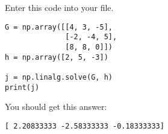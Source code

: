 Enter this code into your file. 
\begin{Verbatim}
G = np.array([[4, 3, -5], 
              [-2, -4, 5], 
              [8, 8, 0]])
h = np.array([2, 5, -3])

j = np.linalg.solve(G, h)
print(j)
\end{Verbatim}
You should get this answer:
\begin{Verbatim}
[ 2.20833333 -2.58333333 -0.18333333]
\end{Verbatim}

